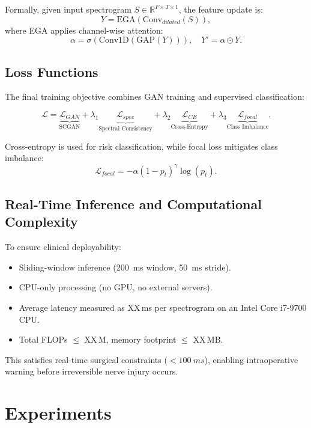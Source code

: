 \documentclass[10pt]{article}
\begin{document}
Formally, given input spectrogram $S \in \mathbb{R}^{F \times T \times 1}$, the feature update is:
\[
Y = \text{EGA}\left(\text{Conv}_{dilated}(S)\right),
\]
where EGA applies channel-wise attention:
\[
\alpha = \sigma\left(\text{Conv1D}(\text{GAP}(Y))\right), \quad
Y' = \alpha \odot Y.
\]

\subsection{Loss Functions}

The final training objective combines GAN training and supervised classification:

\[
\mathcal{L} = 
\underbrace{\mathcal{L}_{GAN}}_{\text{SCGAN}}
+ \lambda_1 \underbrace{\mathcal{L}_{spec}}_{\text{Spectral Consistency}}
+ \lambda_2 \underbrace{\mathcal{L}_{CE}}_{\text{Cross-Entropy}}
+ \lambda_3 \underbrace{\mathcal{L}_{focal}}_{\text{Class Imbalance}}.
\]

Cross-entropy is used for risk classification, while focal loss mitigates class imbalance:
\[
\mathcal{L}_{focal} = -\alpha (1-p_t)^\gamma \log(p_t).
\]

\subsection{Real-Time Inference and Computational Complexity}

To ensure clinical deployability:

\begin{itemize}
    \item Sliding-window inference (\SI{200}{ms} window, \SI{50}{ms} stride).
    \item CPU-only processing (no GPU, no external servers).
    \item Average latency measured as XX\,\si{\milli\second} per spectrogram on an Intel Core i7-9700 CPU.
    \item Total FLOPs $\leq$ XX\,M, memory footprint $\leq$ XX\,MB.
\end{itemize}

This satisfies real-time surgical constraints ($<\SI{100}{ms}$), enabling intraoperative warning before irreversible nerve injury occurs.

\section{Experiments}
\end{document}
